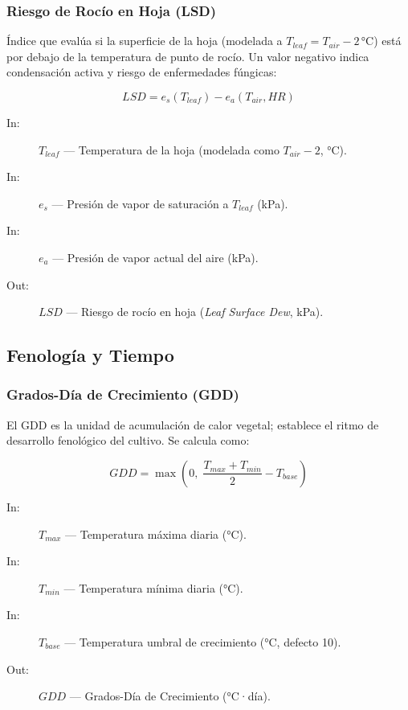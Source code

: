 \subsubsection{Riesgo de Rocío en Hoja (LSD)}

Índice que evalúa si la superficie de la hoja (modelada a $T_{leaf} = T_{air} - 2$\,°C)
está por debajo de la temperatura de punto de rocío. Un valor negativo indica
condensación activa y riesgo de enfermedades fúngicas:

\[
LSD = e_s(T_{leaf}) - e_a(T_{air}, HR)
\]

\begin{description}
        \item [In:] $T_{leaf}$ — Temperatura de la hoja (modelada como $T_{air} - 2$, °C).
    \item [In:] $e_s$ — Presión de vapor de saturación a $T_{leaf}$ (kPa).
    \item [In:] $e_a$ — Presión de vapor actual del aire (kPa).
    \item [Out:] $LSD$ — Riesgo de rocío en hoja (\textit{Leaf Surface Dew}, kPa).
\end{description}

\subsection{Fenología y Tiempo}

\subsubsection{Grados-Día de Crecimiento (GDD)}

El GDD es la unidad de acumulación de calor vegetal; establece el ritmo de desarrollo
fenológico del cultivo. Se calcula como:

\[
GDD = \max\!\left(0,\; \frac{T_{max} + T_{min}}{2} - T_{base}\right)
\]

\begin{description}
        \item [In:] $T_{max}$ — Temperatura máxima diaria (°C).
    \item [In:] $T_{min}$ — Temperatura mínima diaria (°C).
    \item [In:] $T_{base}$ — Temperatura umbral de crecimiento (°C, defecto 10).
    \item [Out:] $GDD$ — Grados-Día de Crecimiento (°C·día).
\end{description}


